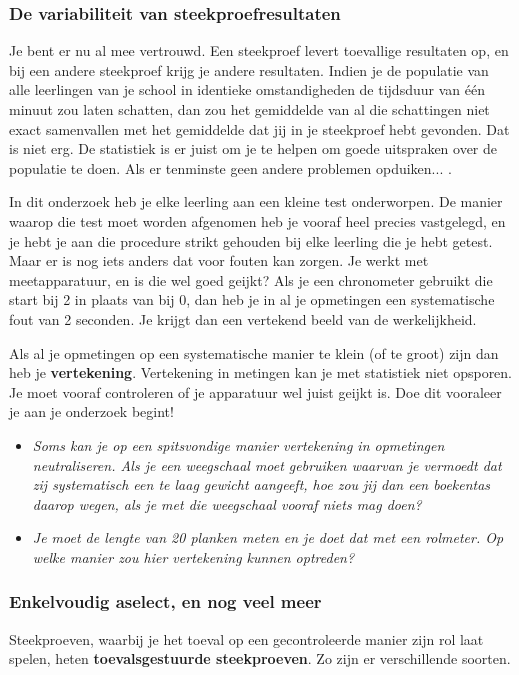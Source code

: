 \documentclass[11pt]{article}
\newcommand{\vraag}[2]{\begin{itemize}\item {\it #1} \vspace*{#2}\end{itemize}}
\begin{document}
\subsubsection{De variabiliteit van steekproefresultaten}

Je bent er nu al mee vertrouwd. Een steekproef levert toevallige resultaten op, en bij een andere
steekproef krijg je andere resultaten. Indien je de populatie van alle leerlingen van je school in
identieke omstandigheden de tijdsduur van één minuut zou laten schatten, dan zou het gemiddelde
van al die schattingen niet exact samenvallen met het gemiddelde dat jij in je steekproef hebt
gevonden. Dat is niet erg. De statistiek is er juist om je te helpen om goede uitspraken over de
populatie te doen. Als er tenminste geen andere problemen opduiken... .

In dit onderzoek heb je elke leerling aan een kleine test onderworpen. De manier waarop die test
moet worden afgenomen heb je vooraf heel precies vastgelegd, en je hebt je aan die procedure strikt
gehouden bij elke leerling die je hebt getest. Maar er is nog iets anders dat voor fouten kan zorgen.
Je werkt met meetapparatuur, en is die wel goed geijkt? Als je een chronometer gebruikt die start bij
2 in plaats van bij 0, dan heb je in al je opmetingen een systematische fout van 2 seconden. Je krijgt
dan een vertekend beeld van de werkelijkheid.

Als al je opmetingen op een systematische manier te klein (of te groot) zijn dan heb je {\bf vertekening}.
Vertekening in metingen kan je met statistiek niet opsporen. Je moet vooraf controleren of je
apparatuur wel juist geijkt is. Doe dit vooraleer je aan je onderzoek begint!

\vraag{Soms kan je op een spitsvondige manier vertekening in opmetingen neutraliseren. Als je een
weegschaal moet gebruiken waarvan je vermoedt dat zij systematisch een te laag gewicht
aangeeft, hoe zou jij dan een boekentas daarop wegen, als je met die weegschaal vooraf niets
mag doen?}{4cm}

\vraag{Je moet de lengte van 20 planken meten en je doet dat met een rolmeter. Op welke manier
zou hier vertekening kunnen optreden?}{3cm}

\subsubsection{Enkelvoudig aselect, en nog veel meer}

Steekproeven, waarbij je het toeval op een gecontroleerde manier zijn rol laat spelen, heten
{\bf toevalsgestuurde steekproeven}. Zo zijn er verschillende soorten.
\end{document}
